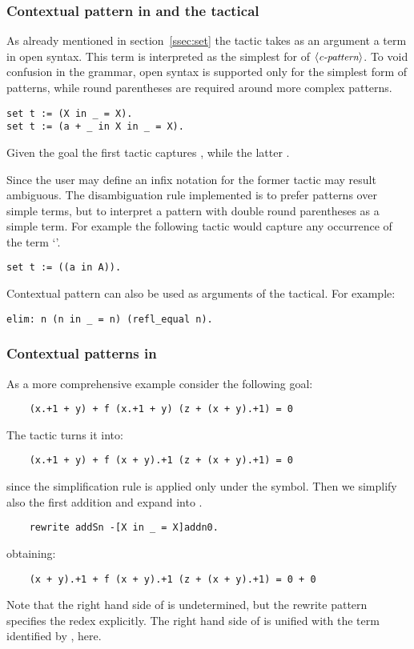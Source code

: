 \subsubsection{Contextual pattern in  and the \C{:} tactical}

As already mentioned in section~\ref{ssec:set} the  tactic
takes as an argument a term in open syntax. This term is interpreted
as the simplest for of $\langle\mbox{\itshape\rmfamily\small c-pattern}\rangle$. To void confusion in the grammar,
open syntax is supported only for the simplest form of patterns, while
round parentheses are required around more complex patterns.

\begin{lstlisting}
set t := (X in _ = X).
set t := (a + _ in X in _ = X).
\end{lstlisting}

Given the goal  the first tactic
captures , while the latter .

Since the user may define an infix notation for  the former 
tactic may result ambiguous. The disambiguation rule implemented is
to prefer patterns over simple terms, but to interpret a pattern with
double round parentheses as a simple term. For example
the following tactic would capture any occurrence of the term `'.

\begin{lstlisting}
set t := ((a in A)).
\end{lstlisting}

Contextual pattern can also be used as arguments of the \C{:} tactical.
For example:
\begin{lstlisting}
elim: n (n in _ = n) (refl_equal n).
\end{lstlisting}

\subsubsection{Contextual patterns in }
As a more comprehensive example consider the following goal:
\begin{lstlisting}
    (x.+1 + y) + f (x.+1 + y) (z + (x + y).+1) = 0
\end{lstlisting}
The tactic  turns it into:
\begin{lstlisting}
    (x.+1 + y) + f (x + y).+1 (z + (x + y).+1) = 0
\end{lstlisting}
since the simplification rule  is applied only under the  symbol.
Then we simplify also the first addition and expand  into .
\begin{lstlisting}
    rewrite addSn -[X in _ = X]addn0.
\end{lstlisting}
obtaining:
\begin{lstlisting}
    (x + y).+1 + f (x + y).+1 (z + (x + y).+1) = 0 + 0
\end{lstlisting}
Note that the right hand side of  is undetermined, but the
rewrite pattern specifies the redex explicitly. The right hand side of 
 is unified with the term identified by ,  here.

